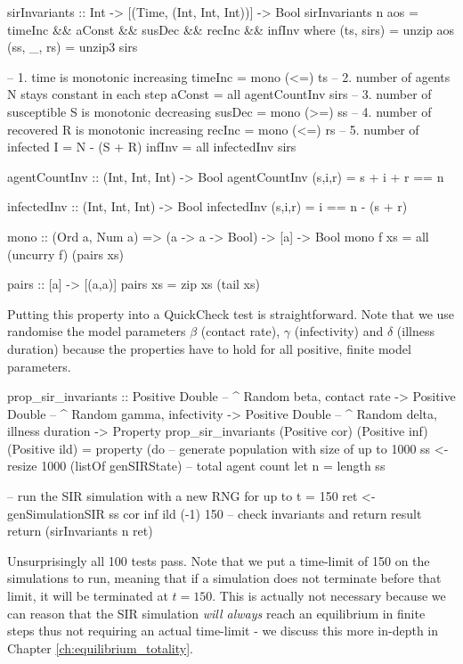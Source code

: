 \begin{HaskellCode}
sirInvariants :: Int -> [(Time, (Int, Int, Int))] -> Bool
sirInvariants n aos = timeInc && aConst && susDec && recInc && infInv
  where
    (ts, sirs)  = unzip aos
    (ss, _, rs) = unzip3 sirs

    -- 1. time is monotonic increasing
    timeInc = mono (<=)  ts
    -- 2. number of agents N stays constant in each step
    aConst = all agentCountInv sirs
    -- 3. number of susceptible S is monotonic decreasing
    susDec = mono (>=) ss
    -- 4. number of recovered R is monotonic increasing
    recInc = mono (<=)  rs
    -- 5. number of infected I = N - (S + R)
    infInv = all infectedInv sirs

    agentCountInv :: (Int, Int, Int) -> Bool
    agentCountInv (s,i,r) = s + i + r == n

    infectedInv :: (Int, Int, Int) -> Bool
    infectedInv (s,i,r) = i == n - (s + r)

    mono :: (Ord a, Num a) => (a -> a -> Bool) -> [a] -> Bool
    mono f xs = all (uncurry f) (pairs xs)

    pairs :: [a] -> [(a,a)]
    pairs xs = zip xs (tail xs)
\end{HaskellCode}

Putting this property into a QuickCheck test is straightforward. Note that we use randomise the model parameters $\beta$ (contact rate), $\gamma$ (infectivity) and $\delta$ (illness duration) because the properties have to hold for all positive, finite model parameters.

\begin{HaskellCode}
prop_sir_invariants :: Positive Double -- ^ Random beta, contact rate
                    -> Positive Double -- ^ Random gamma, infectivity
                    -> Positive Double -- ^ Random delta, illness duration
                    -> Property
prop_sir_invariants (Positive cor) (Positive inf) (Positive ild) = property (do
  -- generate population with size of up to 1000
  ss <- resize 1000 (listOf genSIRState)
  -- total agent count
  let n = length ss

  -- run the SIR simulation with a new RNG for up to t = 150 
  ret <- genSimulationSIR ss cor inf ild (-1) 150
  -- check invariants and return result
  return (sirInvariants n ret)
\end{HaskellCode}

Unsurprisingly all 100 tests pass. Note that we put a time-limit of 150 on the simulations to run, meaning that if a simulation does not terminate before that limit, it will be terminated at $t=150$. This is actually not necessary because we can reason that the SIR simulation \textit{will always} reach an equilibrium in finite steps thus not requiring an actual time-limit - we discuss this more in-depth in Chapter \ref{ch:equilibrium_totality}.

